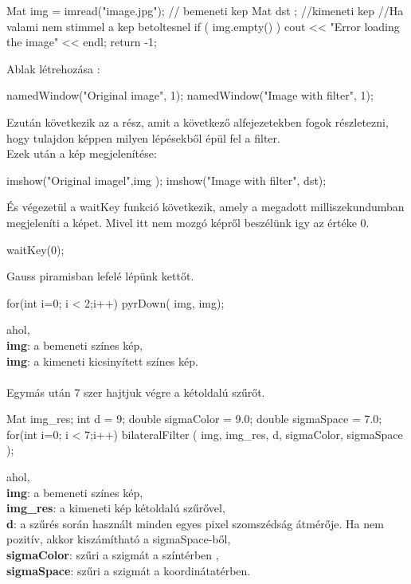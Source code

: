 \begin{cpp}
    Mat img = imread("image.jpg"); // bemeneti kep
    Mat dst ; //kimeneti kep
    //Ha valami nem stimmel a kep betoltesnel
    if ( img.empty() )
    {
        cout << "Error loading the image" << endl;
        return -1;
    }
\end{cpp} 
Ablak létrehozása :
\begin{cpp}
    namedWindow("Original image", 1);
    namedWindow("Image with filter", 1);
\end{cpp}
Ezután következik az a rész, amit a következő alfejezetekben fogok részletezni, hogy tulajdon képpen milyen lépésekből épül fel a filter. \\
Ezek után a kép megjelenítése:
\begin{cpp}
    imshow("Original imagel",img );
    imshow("Image with filter", dst);
\end{cpp}
És végezetül a waitKey funkció következik, amely a megadott milliszekundumban megjeleníti a képet. Mivel itt nem mozgó képről beszélünk igy az értéke 0.
 \begin{cpp}
    waitKey(0);
\end{cpp}
Gauss piramisban lefelé lépünk kettőt.
\begin{cpp}
 for(int i=0; i < 2;i++){
    pyrDown( img, img);
    }
\end{cpp}
ahol, \\
\indent \textbf{img}: a bemeneti színes kép,\\
\indent \textbf{img}: a kimeneti kicsinyített színes kép.\\\\
Egymás után 7 szer hajtjuk végre a kétoldalú szűrőt.
\begin{cpp}
Mat img_res;
int d = 9;
double sigmaColor = 9.0;
double sigmaSpace = 7.0;
for(int i=0; i < 7;i++){
    bilateralFilter ( img, img_res, d, sigmaColor, sigmaSpace );
    }
\end{cpp}
ahol, \\
\indent \textbf{img}: a bemeneti színes kép,\\
\indent \textbf{img\_res}: a kimeneti kép kétoldalú szűrővel,\\
\indent \textbf{d}: a szűrés során használt minden egyes pixel szomszédság átmérője. Ha nem pozitív, akkor kiszámítható a sigmaSpace-ből,\\
\indent \textbf{sigmaColor}: szűri a szigmát a színtérben ,\\
\indent \textbf{sigmaSpace}: szűri a szigmát a koordinátatérben.\\ \\
